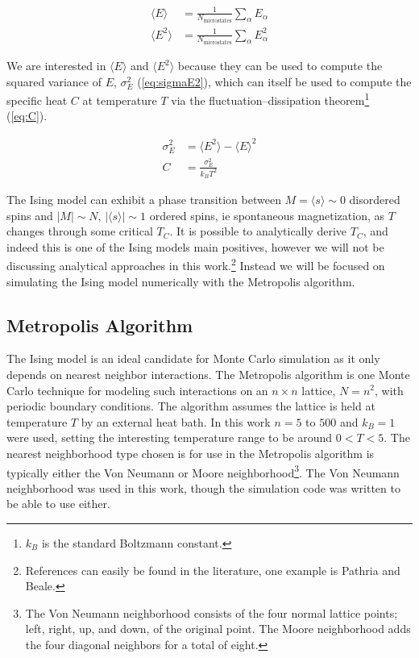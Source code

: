 \documentclass[notitlepage,aps,prd,nofootinbib]{revtex4-1}
\begin{document}
\begin{align}
\langle E \rangle &= \frac{1}{N_{\mathrm{microstates}}} \sum_{\alpha} E_{\alpha} \label{eq:ave_E} \\
\langle E^{2} \rangle &= \frac{1}{N_{\mathrm{microstates}}} \sum_{\alpha} E_{\alpha}^{2} \label{eq:ave_E2}
\end{align}

We are interested in $\langle E \rangle$ and $\langle E^{2} \rangle$ because they can be used to compute the squared variance of $E$, $\sigma_{E}^{2}$ (\ref{eq:sigmaE2}), which can itself be used to compute the specific heat $C$ at temperature $T$ via the fluctuation--dissipation theorem\footnote{$k_{B}$ is the standard Boltzmann constant.} (\ref{eq:C}).

\begin{align}
\sigma_{E}^{2} &=  \langle E^{2} \rangle - \langle E \rangle^{2} \label{eq:sigmaE2} \\
C &= \frac{\sigma_{E}^{2}}{k_{B} T^{2}} \label{eq:C}
\end{align}

The Ising model can exhibit a phase transition between $M=\langle s \rangle \sim 0$ disordered spins and $\left|M\right|\sim N,\,\left|\langle s \rangle\right| \sim 1$ ordered spins, ie spontaneous magnetization, as $T$ changes through some critical $T_{C}$. It is possible to analytically derive $T_{C}$, and indeed this is one of the Ising models main positives, however we will not be discussing analytical approaches in this work.\footnote{References can easily be found in the literature, one example is Pathria and Beale.} Instead we will be focused on simulating the Ising model numerically with the Metropolis algorithm.

\subsection{Metropolis Algorithm}
\label{subsec:met_alg}

The Ising model is an ideal candidate for Monte Carlo simulation as it only depends on nearest neighbor interactions. The Metropolis algorithm is one Monte Carlo technique for modeling such interactions on an $n\times n$ lattice, $N=n^{2}$, with periodic boundary conditions. The algorithm assumes the lattice is held at temperature $T$ by an external heat bath. In this work $n=5$ to $500$ and $k_{B}=1$ were used, setting the interesting temperature range to be around $0 < T < 5$. The nearest neighborhood type chosen is for use in the Metropolis algorithm is typically either the Von Neumann or Moore neighborhood\footnote{The Von Neumann neighborhood consists of the four normal lattice points; left, right, up, and down, of the original point. The Moore neighborhood adds the four diagonal neighbors for a total of eight.}. The Von Neumann neighborhood was used in this work, though the simulation code was written to be able to use either.
\end{document}
